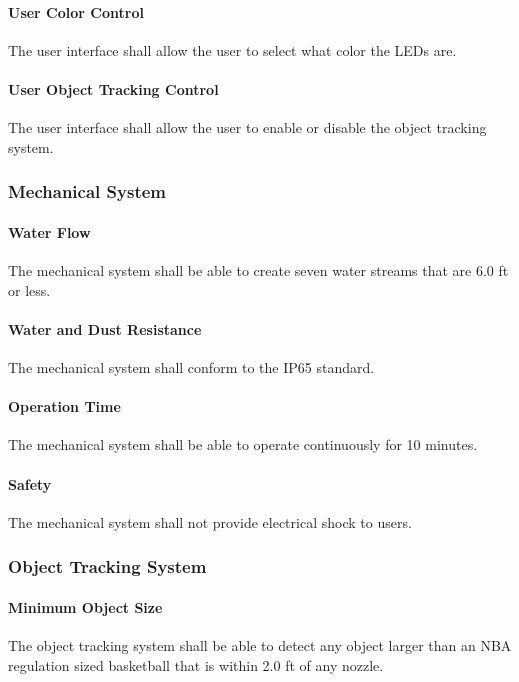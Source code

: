 \paragraph{User Color Control}
The user interface shall allow the user to select what color the LEDs are.

\paragraph{User Object Tracking Control}
The user interface shall allow the user to enable or disable the object tracking system.

\subsubsection{Mechanical System}

\paragraph{Water Flow}
The mechanical system shall be able to create seven water streams that are 6.0 ft or less. 

\paragraph{Water and Dust Resistance}
The mechanical system shall conform to the IP65 standard.   

\paragraph{Operation Time}
The mechanical system shall be able to operate continuously for 10 minutes. 

\paragraph{Safety}
The mechanical system shall not provide electrical shock to users. 

\subsubsection{Object Tracking System}

\paragraph{Minimum Object Size}
The object tracking system shall be able to detect any object larger than an NBA regulation sized basketball that is within 2.0 ft of any nozzle.

